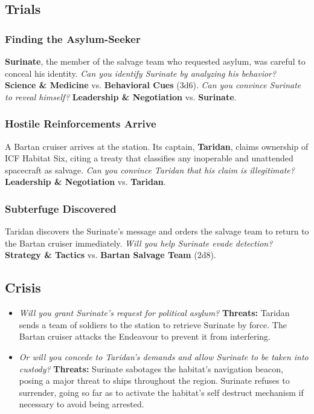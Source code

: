 \documentclass[11pt, a5paper, parskip=half-, DIV=12]{scrartcl}
\begin{document}
\newpage

\subsection*{Trials}
\subsubsection*{Finding the Asylum-Seeker}
\textbf{Surinate}, the member of the salvage team who requested asylum, was careful to conceal his identity. \textit{Can you identify Surinate by analyzing his behavior?}
\textbf{Science \& Medicine} vs. \textbf{Behavioral Cues} (3d6). \textit{Can you convince Surinate to reveal himself?} \textbf{Leadership \& Negotiation} vs. \textbf{Surinate}. 

\subsubsection*{Hostile Reinforcements Arrive}
A Bartan cruiser arrives at the station.  Its captain, \textbf{Taridan}, claims ownership of ICF Habitat Six, citing a treaty that classifies any inoperable and unattended spacecraft as salvage. \textit{Can you convince Taridan that his claim is illegitimate?} \textbf{Leadership \& Negotiation} vs. \textbf{Taridan}.

\subsubsection*{Subterfuge Discovered}
Taridan discovers the Surinate's message and orders the salvage team to return to the Bartan cruiser immediately. \textit{Will you help Surinate evade detection?} \textbf{Strategy \& Tactics} vs. \textbf{Bartan Salvage Team} (2d8).

\subsection*{Crisis}
\begin{itemize}
	\item \textit{Will you grant Surinate's request for political asylum?} \textbf{Threats:} Taridan sends a team of soldiers to the station to retrieve Surinate by force. The Bartan cruiser attacks the Endeavour to prevent it from interfering.
	\item \textit{Or will you concede to Taridan's demands and allow Surinate to be taken into custody?} \textbf{Threats:} Surinate sabotages the habitat's navigation beacon, posing a major threat to ships throughout the region. Surinate refuses to surrender, going so far as to activate the habitat's self destruct mechanism if necessary to avoid being arrested.
\end{itemize}
\end{document}
